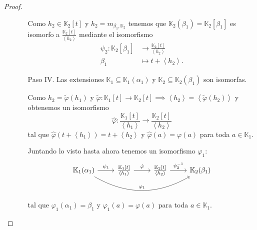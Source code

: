 \documentclass[10pt, spanish]{report}
\theoremstyle{definition}
\newcommand{\K}{\mathbb{K}}
\begin{document}
\begin{proof}
\begin{itemize}[itemindent=30pt]
\begin{enumerate}[itemindent=24pt]
                    Como $h_2\in\K_2[t]$  y $h_2=m_{\beta_1,\K_2}$ tenemos que
                    $\K_2(\beta_1)=\K_2[\beta_1]$ es isomorfo a
                    $\frac{\K_2[t]}{\left< h_2 \right> }$ mediante el
                    isomorfismo
                    \begin{align*}
                        \psi_2: \K_2[\beta_1]&\to \frac{\K_2[t]}{\left< h_2
                        \right>}\\
                            \beta_1&\mapsto t+\left<h_2\right>.
                    \end{align*}

                \item[Paso IV.] Las extensiones $\K_1\subseteq\K_1(\alpha_1)$ y
                    $\K_2\subseteq\K_2(\beta_1)$ son isomorfas.

                    Como $h_2=\tilde{\varphi}(h_1)$ y
                    $\tilde{\varphi}:\K_1[t]\to \K_2[t]\implies\left<h_2\right>
                    = \left< \tilde{\varphi}(h_2) \right> $ y obtenemos un
                    isomorfismo \[\hat{\varphi}:\frac{\K_1[t]}{\left<h_1\right>}
                    \to \frac{\K_2[t]}{\left<h_2\right>}\] tal que
                    $\hat{\varphi}(t+\left< h_1 \right> )=t+\left< h_2 \right>$
                    y $\hat{\varphi}(a)=\varphi(a)$ para toda $a\in\K_1$.

                    Juntando lo visto hasta ahora tenemos un isomorfismo
                    $\varphi_1$:
                    \[\begin{tikzcd}
                        \K_1(\alpha_1)\ar{r}{\psi_1}\ar[bend right]{rrr}{\varphi_1}&
                    \frac{\K_1[t]}{\left<h_1\right>}\ar{r}{\hat{\varphi}}&
                    \frac{\K_2[t]}{\left<h_2\right>}\ar{r} {\psi_2^{-1}}&
                        \K_2(\beta_1)
                    \end{tikzcd}\]
                    tal que $\varphi_1(\alpha_1)=\beta_1$ y
                    $\varphi_1(a)=\varphi(a)$ para toda $a\in\K_1$.


\end{enumerate}
\end{itemize}
\end{proof}
\end{document}
